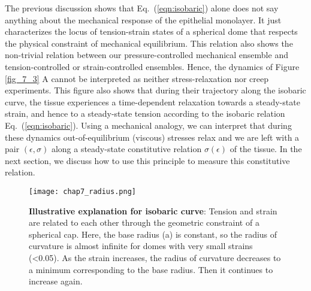 The previous discussion shows that Eq.~(\ref{eqn:isobaric}) alone does not say anything about the mechanical response of the epithelial monolayer. It just characterizes the locus of tension-strain states of a spherical dome that respects the physical constraint of mechanical equilibrium. This relation also shows the non-trivial relation between our pressure-controlled mechanical ensemble and tension-controlled  or strain-controlled ensembles. Hence, the dynamics of Figure \ref{fig_7_3} A cannot be interpreted as neither stress-relaxation nor creep experiments. This figure also shows that during their trajectory along the isobaric curve, the tissue experiences a time-dependent relaxation towards a steady-state strain, and hence to a steady-state tension according to the isobaric relation Eq.~(\ref{eqn:isobaric}). Using a mechanical analogy, we can interpret that during these dynamics out-of-equilibrium (viscous) stresses relax and we are left with a pair $(\epsilon, \sigma)$ along a steady-state constitutive relation $\sigma(\epsilon)$ of the tissue. In the next section, we discuss how to use this principle to measure this constitutive relation.



\begin{figure}
	\centering
	\texttt{[image: chap7\_radius.png]}
	\caption{\label{fig_7_4} \textbf{Illustrative explanation for isobaric curve}: Tension and strain are related to each other through the geometric constraint of a spherical cap. Here, the base radius (a) is constant, so the radius of curvature is almost infinite for domes with very small strains (<0.05). As the strain increases, the radius of curvature decreases to a minimum corresponding to the base radius. Then it continues to increase again.	
	}
\end{figure}

